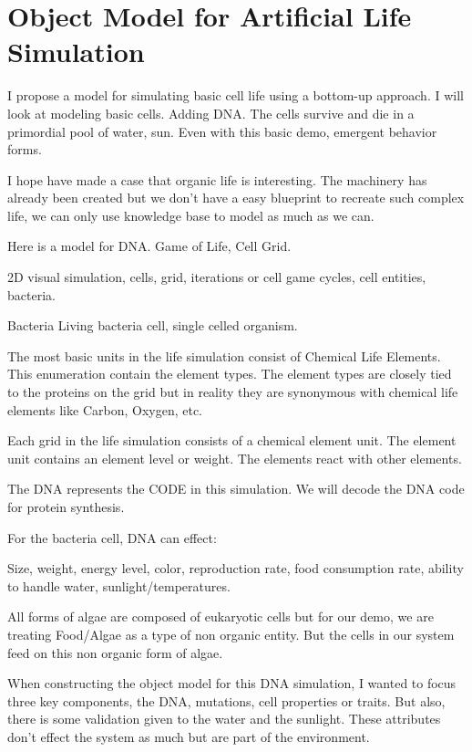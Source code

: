 \section{Object Model for Artificial Life Simulation}

I propose a model for simulating basic cell life using a bottom-up approach.  I
will look at modeling basic cells.  Adding DNA.  The cells survive and die in a
primordial pool of water, sun.  Even with this basic demo, emergent behavior
forms.


I hope have made a case that organic life is interesting.  The machinery has
already been created but we don't have a easy blueprint to recreate such complex
life, we can only use knowledge base to model as much as we can.

Here is a model for DNA. Game of Life, Cell Grid.

2D visual simulation, cells, grid, iterations or cell game cycles, cell
entities, bacteria.

Bacteria Living bacteria cell, single celled organism.

The most basic units in the life simulation consist of
Chemical Life Elements.  This enumeration contain the element types.
The element types are closely tied to the proteins on the grid
but in reality they are synonymous with chemical life elements like Carbon, Oxygen, etc.

Each grid in the life simulation consists of a chemical element unit.
The element unit contains an element level or weight.  The elements
react with other elements.

The DNA represents the CODE in this simulation.
We will decode the DNA code for protein synthesis.

For the bacteria cell, DNA can effect:

Size, weight, energy level, color, reproduction rate, 
food consumption rate, ability to handle water, sunlight/temperatures.

All forms of algae are composed of eukaryotic cells but for our demo, we are treating 
Food/Algae as a type of non organic entity.  But the cells in our system feed on this non organic form of algae.

When constructing the object model for this DNA simulation, I wanted to focus
three key components, the DNA, mutations, cell properties or traits.  But also,
there is some validation given to the water and the sunlight.  These attributes
don't effect the system as much but are part of the environment.

